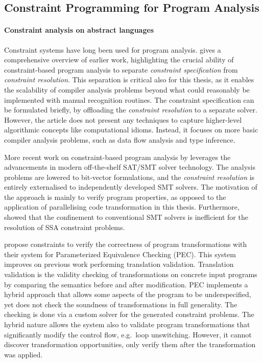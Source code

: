 \subsection{Constraint Programming for Program Analysis}

    \paragraph*{Constraint analysis on abstract languages}
    Constraint systems have long been used for program analysis.
    \citet{Aiken:1999:ISC:339853.339897} gives a comprehensive overview of
    earlier work, highlighting the crucial ability of constraint-based program
    analysis to separate {\it constraint specification} from
    {\it constraint resolution}.
    This separation is critical also for this thesis, as it enables the
    scalability of compiler analysis problems beyond what could reasonably be
    implemented with manual recognition routines.
    The constraint specification can be formulated briefly, by offloading the
    {\it constraint resolution} to a separate solver.
    However, the article does not present any techniques to capture higher-level
    algorithmic concepts like computational idioms.
    Instead, it focuses on more basic compiler analysis problems, such as
    data flow analysis and type inference.

    More recent work on constraint-based program analysis by
    \citet{Gulwani:2008:PAC:1375581.1375616} leverages the advancements in
    modern off-the-shelf SAT/SMT solver technology.
    The analysis problems are lowered to bit-vector formulations, and the
    {\it constraint resolution} is entirely externalised to independently
    developed SMT solvers.
    The motivation of the approach is mainly to verify program properties,
    as opposed to the application of parallelising code transformation in this
    thesis.
    Furthermore,  showed that the confinement to
    conventional SMT solvers is inefficient for the resolution of
    SSA constraint problems.

    \citet{Kundu:2009:POC:1543135.1542513} propose constraints to verify the
    correctness of program transformations with their system for
    Parameterized Equivalence Checking (PEC).
    This system improves on previous work performing translation validation.
    Translation validation is the validity checking of transformations on
    concrete input programs by comparing the semantics before and after
    modification.
    PEC implements a hybrid approach that allows some aspects of the program
    to be underspecified, yet does not check the soundness of transformations
    in full generality.
    The checking is done via a custom solver for the generated constraint
    problems.
    The hybrid nature allows the system also to validate program transformations
    that significantly modify the control flow, e.g.\ loop unswitching.
    However, it cannot discover transformation opportunities, only verify them
    after the transformation was applied.

